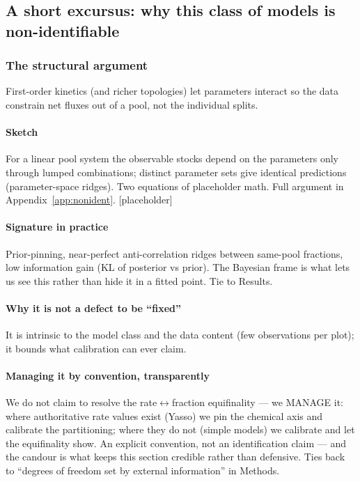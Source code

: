 \documentclass[11pt]{article}
\begin{document}
\subsection{A short excursus: why this class of models is non-identifiable}

\subsubsection{The structural argument}
First-order kinetics (and richer topologies) let parameters interact so the
data constrain net fluxes out of a pool, not the individual splits.

\paragraph{Sketch}
For a linear pool system the observable stocks depend on the parameters only
through lumped combinations; distinct parameter sets give identical
predictions (parameter-space ridges). Two equations of placeholder math.
Full argument in Appendix~\ref{app:nonident}. [placeholder]

\paragraph{Signature in practice}
Prior-pinning, near-perfect anti-correlation ridges between same-pool
fractions, low information gain (KL of posterior vs prior). The Bayesian frame
is what lets us see this rather than hide it in a fitted point. Tie to Results.

\paragraph{Why it is not a defect to be ``fixed''}
It is intrinsic to the model class and the data content (few observations per
plot); it bounds what calibration can ever claim.

\paragraph{Managing it by convention, transparently}
We do not claim to resolve the rate$\leftrightarrow$fraction equifinality --- we
MANAGE it: where authoritative rate values exist (Yasso) we pin the chemical axis
and calibrate the partitioning; where they do not (simple models) we calibrate and
let the equifinality show. An explicit convention, not an identification claim ---
and the candour is what keeps this section credible rather than defensive. Ties
back to ``degrees of freedom set by external information'' in Methods.
\end{document}
